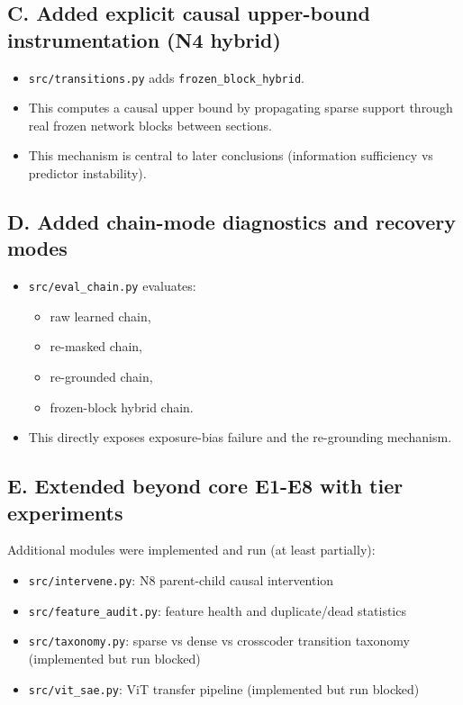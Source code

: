 \documentclass[11pt]{article}
\begin{document}
\subsection{C. Added explicit causal upper-bound instrumentation (N4 hybrid)}
\begin{itemize}[leftmargin=*]
    \item \texttt{src/transitions.py} adds \texttt{frozen\_block\_hybrid}.
    \item This computes a causal upper bound by propagating sparse support through real frozen network blocks between sections.
    \item This mechanism is central to later conclusions (information sufficiency vs predictor instability).
\end{itemize}

\subsection{D. Added chain-mode diagnostics and recovery modes}
\begin{itemize}[leftmargin=*]
    \item \texttt{src/eval\_chain.py} evaluates:
    \begin{itemize}[leftmargin=*]
        \item raw learned chain,
        \item re-masked chain,
        \item re-grounded chain,
        \item frozen-block hybrid chain.
    \end{itemize}
    \item This directly exposes exposure-bias failure and the re-grounding mechanism.
\end{itemize}

\subsection{E. Extended beyond core E1-E8 with tier experiments}
Additional modules were implemented and run (at least partially):
\begin{itemize}[leftmargin=*]
    \item \texttt{src/intervene.py}: N8 parent-child causal intervention
    \item \texttt{src/feature\_audit.py}: feature health and duplicate/dead statistics
    \item \texttt{src/taxonomy.py}: sparse vs dense vs crosscoder transition taxonomy (implemented but run blocked)
    \item \texttt{src/vit\_sae.py}: ViT transfer pipeline (implemented but run blocked)
\end{itemize}
\end{document}
